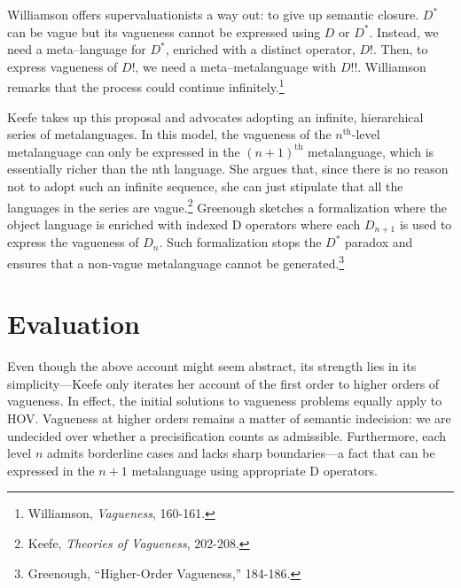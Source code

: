 Williamson offers supervaluationists a way out: to give up semantic
closure. $D^*$ can be vague but its vagueness cannot be expressed using $D$
or $D^*$. Instead, we need a meta--language for $D^*$, enriched with a distinct
operator, $D!$. Then, to express vagueness of $D!$, we need a
meta--metalanguage with $D!!$. Williamson remarks that the process could
continue infinitely.\footnote{Williamson, \emph{Vagueness}, 160-161.}

Keefe takes up this proposal and advocates adopting an infinite,
hierarchical series of metalanguages. In this model, the vagueness of
the $n^{\text{th}}$-level metalanguage can only be expressed in the $(n+1)^{\text{th}}$
metalanguage, which is essentially richer than the nth language. She
argues that, since there is no reason not to adopt such an infinite
sequence, she can just stipulate that all the languages in the series
are vague.\footnote{Keefe, \emph{Theories of Vagueness}, 202-208.}
Greenough sketches a formalization where the object language is enriched
with indexed D operators where each \(D_{n + 1}\) is used to express the
vagueness of \(D_{n}\). Such formalization stops the $D^*$ paradox and
ensures that a non-vague metalanguage cannot be generated.\footnote{Greenough,
  ``Higher-Order Vagueness,'' 184-186.}

\section{Evaluation}

Even though the above account might seem abstract, its strength lies in
its simplicity---Keefe only iterates her account of the first order to
higher orders of vagueness. In effect, the initial solutions to
vagueness problems equally apply to HOV. Vagueness at higher orders
remains a matter of semantic indecision: we are undecided over whether a
precisification counts as admissible. Furthermore, each level $n$
admits borderline cases and lacks sharp boundaries---a fact that can be
expressed in the $n+1$ metalanguage using appropriate D operators.

